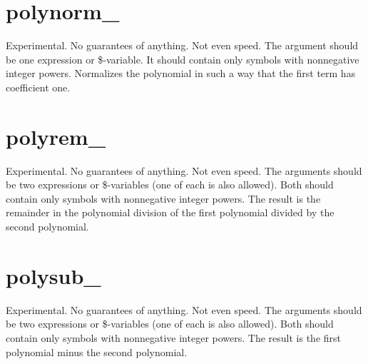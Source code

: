 \section{polynorm\_}
\label{funpolynorm}
\noindent Experimental. No guarantees of anything. Not even speed. The 
argument should be one expression or 
\$-variable.
It should contain only symbols with nonnegative integer powers. Normalizes 
the polynomial in such a way that the first term has coefficient one.

\section{polyrem\_}
\label{funpolyrem}
\noindent Experimental. No guarantees of anything. Not even speed. The 
arguments should be two expressions or 
\$-variables (one of each is also allowed). Both should 
contain only symbols with nonnegative integer powers. The result is the 
remainder in the polynomial division of the first polynomial divided by the 
second polynomial.

\section{polysub\_}
\label{funpolysub}
\noindent Experimental. No guarantees of anything. Not even speed. The 
arguments should be two expressions or 
\$-variables (one of each is also allowed). Both should 
contain only symbols with nonnegative integer powers. The result is the 
first polynomial minus the second polynomial.

